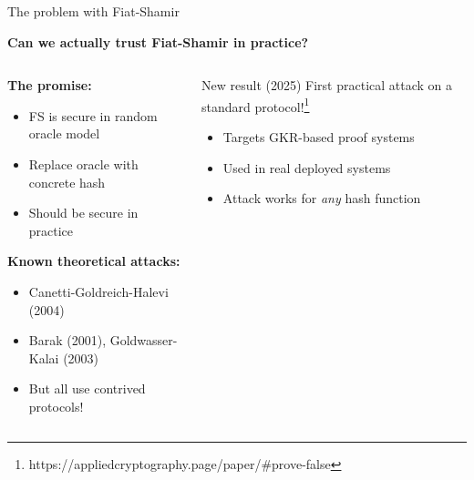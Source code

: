 \documentclass[aspectratio=169, lualatex, handout]{beamer}
\begin{document}
\begin{frame}{The problem with Fiat-Shamir}
	\begin{center}
		\textbf{Can we actually trust Fiat-Shamir in practice?}
	\end{center}
	\vspace{0.5em}
	\begin{columns}[c]
		\begin{column}{0.5\textwidth}
			\textbf{The promise:}
			\begin{itemize}
				\item FS is secure in random oracle model
				\item Replace oracle with concrete hash
				\item Should be secure in practice
			\end{itemize}
			\vspace{0.5em}
			\textbf{Known theoretical attacks:}
			\begin{itemize}
				\item Canetti-Goldreich-Halevi (2004)
				\item Barak (2001), Goldwasser-Kalai (2003)
				\item But all use contrived protocols!
			\end{itemize}
		\end{column}
		\begin{column}{0.5\textwidth}
			\begin{alertblock}{New result (2025)}
				First practical attack on a standard protocol!\footnote{https://appliedcryptography.page/paper/\#prove-false}
				\begin{itemize}
					\item Targets GKR-based proof systems
					\item Used in real deployed systems
					\item Attack works for \textit{any} hash function
				\end{itemize}
			\end{alertblock}
		\end{column}
	\end{columns}
\end{frame}
\end{document}
